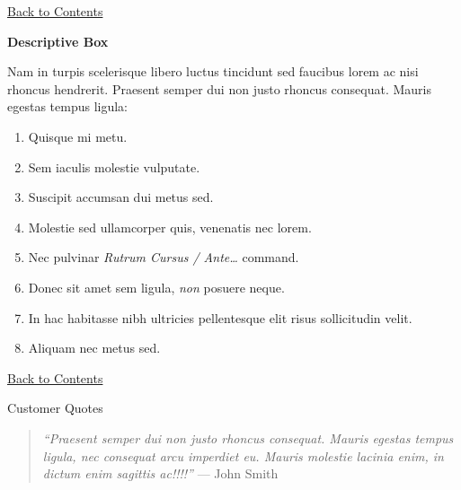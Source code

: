 \documentclass[11pt, letterpaper]{article}
\newcommand{\heading}[2]{ %
\vspace{#2} %
{\begin{center}\Large\textbf{#1}\end{center}} %
\vspace{#2} %
}
\newcommand{\BackToContents}{\hyperlink{contents}{{\small Back to Contents}}} %
\begin{document}
\begin{minipage}[t]{.66\linewidth}
\begin{multicols}{2}
\BackToContents %

\end{multicols}


\begin{mdframed}[style=intextbox,frametitle={}] %

\hypertarget{descriptivebox}{\heading{Descriptive Box}{0pt}} %

Nam in turpis scelerisque libero luctus tincidunt sed faucibus lorem ac nisi rhoncus hendrerit. Praesent semper dui non justo rhoncus consequat. Mauris egestas tempus ligula:
\begin{enumerate}
\item Quisque mi metu.
\item Sem iaculis molestie vulputate.
\item Suscipit accumsan dui metus sed.
\item Molestie sed ullamcorper quis, venenatis nec lorem.
\item Nec pulvinar \textsl{Rutrum Cursus / Ante\dots} command.
\item Donec sit amet sem ligula,  \textsl{non} posuere neque.
\item In hac habitasse nibh ultricies pellentesque elit risus sollicitudin velit.
\item Aliquam nec metus sed.
\end{enumerate}

\BackToContents %

\end{mdframed}


\hypertarget{quotation}{{\large Customer Quotes}} %

\begin{quote}
\textsl{``Praesent semper dui non justo rhoncus consequat. Mauris egestas tempus ligula, nec consequat arcu imperdiet eu. Mauris molestie lacinia enim, in dictum enim sagittis ac!!!!''} --- \textrm{John Smith}
\end{quote}


\end{minipage}\hfill %
\end{document}
